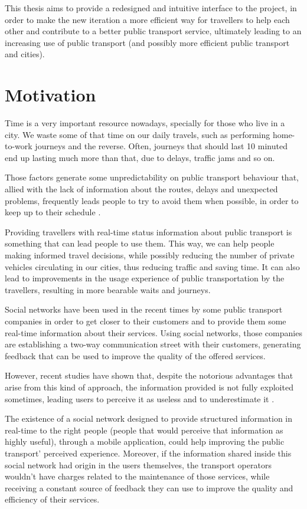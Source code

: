 This thesis aims to provide a redesigned and intuitive interface to the project, in order to make the new iteration a more efficient way for travellers to help each other and contribute to a better public transport service, ultimately leading to an increasing use of public transport (and possibly more efficient public transport and cities). 

\section{Motivation} \label{sec:motivation}

Time is a very important resource nowadays, specially for those who live in a city. We waste some of that time on our daily travels, such as performing home-to-work journeys and the reverse. Often, journeys that should last 10 minuted end up lasting much more than that, due to delays, traffic jams and so on. 

Those factors generate some unpredictability on public transport behaviour that, allied with the lack of information about the routes, delays and unexpected problems, frequently leads people to try to avoid them when possible, in order to keep up to their schedule \cite{kn:BC07}.

Providing travellers with real-time status information about public transport is something that can lead people to use them. This way, we can help people making informed travel decisions, while possibly reducing the number of private vehicles circulating in our cities, thus reducing traffic and saving time. It can also lead to improvements in the usage experience of public transportation by the travellers, resulting in more bearable waits and journeys.

Social networks have been used in the recent times by some public transport companies in order to get closer to their customers and to provide them some real-time information about their services. Using social networks, those companies are establishing a two-way communication street with their customers, generating feedback that can be used to improve the quality of the offered services.

However, recent studies have shown that, despite the notorious advantages that arise from this kind of approach, the information provided is not fully exploited sometimes, leading users to perceive it as useless and to underestimate it \cite{kn:NGeCP11}.

The existence of a social network designed to provide structured information in real-time to the right people (people that would perceive that information as highly useful), through a mobile application, could help improving the public transport' perceived experience. Moreover, if the information shared inside this social network had origin in the users themselves, the transport operators wouldn't have charges related to the maintenance of those services, while receiving a constant source of feedback they can use to improve the quality and efficiency of their services.

